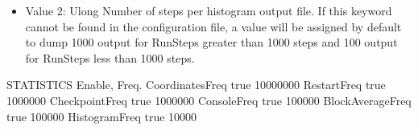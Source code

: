 \documentclass[letterpaper,10pt,english]{sphinxmanual}
\begin{document}
\begin{description}
\begin{itemize}
\item {} 
\sphinxAtStartPar
Value 2: Ulong \sphinxhyphen{} Number of steps per histogram output file. If this keyword cannot be found in the configuration file, a value will be assigned by default to dump 1000 output for RunSteps greater than 1000 steps and 100 output for RunSteps less than 1000 steps.

\end{itemize}

\begin{sphinxVerbatim}[commandchars=\\\{\}]
\PYGZsh{}\PYGZsh{}\PYGZsh{}\PYGZsh{}\PYGZsh{}\PYGZsh{}\PYGZsh{}\PYGZsh{}\PYGZsh{}\PYGZsh{}\PYGZsh{}\PYGZsh{}\PYGZsh{}\PYGZsh{}\PYGZsh{}\PYGZsh{}\PYGZsh{}\PYGZsh{}\PYGZsh{}\PYGZsh{}\PYGZsh{}\PYGZsh{}\PYGZsh{}\PYGZsh{}\PYGZsh{}\PYGZsh{}\PYGZsh{}\PYGZsh{}\PYGZsh{}\PYGZsh{}\PYGZsh{}\PYGZsh{}\PYGZsh{}
\PYGZsh{} STATISTICS Enable, Freq.
\PYGZsh{}\PYGZsh{}\PYGZsh{}\PYGZsh{}\PYGZsh{}\PYGZsh{}\PYGZsh{}\PYGZsh{}\PYGZsh{}\PYGZsh{}\PYGZsh{}\PYGZsh{}\PYGZsh{}\PYGZsh{}\PYGZsh{}\PYGZsh{}\PYGZsh{}\PYGZsh{}\PYGZsh{}\PYGZsh{}\PYGZsh{}\PYGZsh{}\PYGZsh{}\PYGZsh{}\PYGZsh{}\PYGZsh{}\PYGZsh{}\PYGZsh{}\PYGZsh{}\PYGZsh{}\PYGZsh{}\PYGZsh{}\PYGZsh{}
CoordinatesFreq   true 10000000
RestartFreq       true 1000000
CheckpointFreq    true 1000000
ConsoleFreq       true 100000
BlockAverageFreq  true 100000
HistogramFreq     true 10000
\end{sphinxVerbatim}

\end{description}
\end{document}
